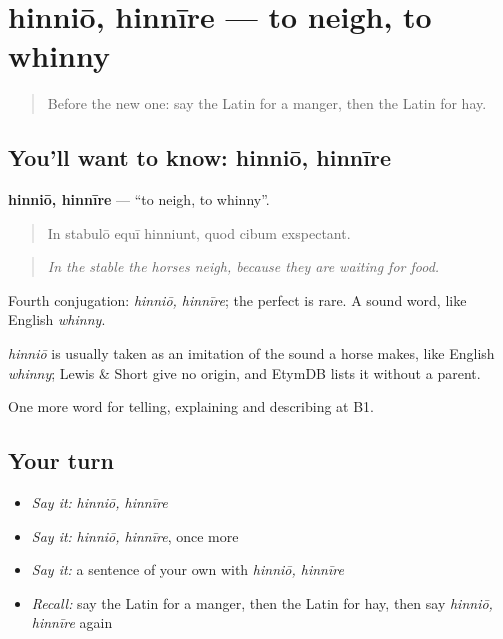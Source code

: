 \section[hinniō, hinnīre]{hinniō, hinnīre — to neigh, to whinny}

\label{lesson:LA-C434-hinnio}



\begin{quote}
Before the new one: say the Latin for a manger, then the Latin for hay.
\end{quote}

\subsection*{You'll want to know: hinniō, hinnīre}
\textbf{hinniō, hinnīre} — \textquotedblleft{}to neigh, to whinny\textquotedblright{}.

\begin{quote}
In stabulō equī hinniunt, quod cibum exspectant.
\end{quote}

\begin{quote}
\emph{In the stable the horses neigh, because they are waiting for food.}
\end{quote}

Fourth conjugation: \emph{hinniō, hinnīre}; the perfect is rare. A sound word, like English \emph{whinny}.

\begin{cousinweb}
\emph{hinniō} is usually taken as an imitation of the sound a horse makes, like English \emph{whinny}; Lewis \& Short give no origin, and EtymDB lists it without a parent.
\end{cousinweb}

\begin{grammarlens}[title={What you've built}]
One more word for telling, explaining and describing at B1.
\end{grammarlens}

\subsection*{Your turn}
\begin{itemize}
\raggedright
  \item \emph{Say it:} \emph{hinniō, hinnīre}
  \item \emph{Say it:} \emph{hinniō, hinnīre}, once more
  \item \emph{Say it:} a sentence of your own with \emph{hinniō, hinnīre}
  \item \emph{Recall:} say the Latin for a manger, then the Latin for hay, then say \emph{hinniō, hinnīre} again
\end{itemize}

